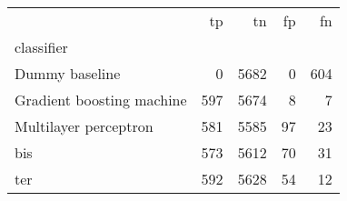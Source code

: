 \begin{tabular}{lrrrr}
\toprule
 & tp & tn & fp & fn \\
classifier &  &  &  &  \\
\midrule
Dummy baseline & 0 & 5682 & 0 & 604 \\
Gradient boosting machine & 597 & 5674 & 8 & 7 \\
Multilayer perceptron & 581 & 5585 & 97 & 23 \\
bis & 573 & 5612 & 70 & 31 \\
ter & 592 & 5628 & 54 & 12 \\
\bottomrule
\end{tabular}
